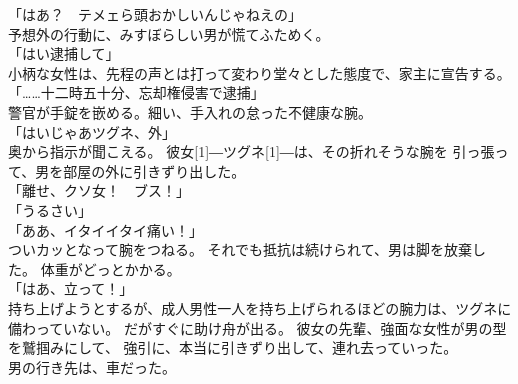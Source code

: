 \documentclass[../NenokuniMain]{subfiles}
\begin{document}
「はあ？　テメェら頭おかしいんじゃねえの」\\
予想外の行動に、みすぼらしい男が慌てふためく。\\
「はい逮捕して」\\
小柄な女性は、先程の声とは打って変わり堂々とした態度で、家主に宣告する。\\
「……十二時五十分、忘却権侵害で逮捕」\\
警官が手錠を嵌める。細い、手入れの怠った不健康な腕。\\
「はいじゃあツグネ、外」\\
奥から指示が聞こえる。
彼女\scalebox{2}[1]{―}ツグネ\scalebox{2}[1]{―}は、その折れそうな腕を
引っ張って、男を部屋の外に引きずり出した。\\
「離せ、クソ女！　ブス！」\\
「うるさい」\\
「ああ、イタイイタイ痛い！」\\
ついカッとなって腕をつねる。
それでも抵抗は続けられて、男は脚を放棄した。
体重がどっとかかる。\\
「はあ、立って！」\\
持ち上げようとするが、成人男性一人を持ち上げられるほどの腕力は、ツグネに備わっていない。
だがすぐに助け舟が出る。
彼女の先輩、強面な女性が男の型を鷲掴みにして、
強引に、本当に引きずり出して、連れ去っていった。\\

男の行き先は、車だった。
\end{document}
